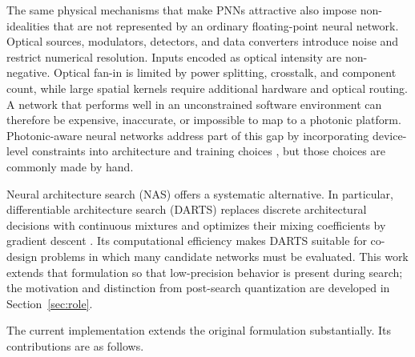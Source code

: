 \documentclass[lettersize,journal]{IEEEtran}
\begin{document}
The same physical mechanisms that make PNNs attractive also impose non-idealities that are not represented by an ordinary floating-point neural network. Optical sources, modulators, detectors, and data converters introduce noise and restrict numerical resolution. Inputs encoded as optical intensity are non-negative. Optical fan-in is limited by power splitting, crosstalk, and component count, while large spatial kernels require additional hardware and optical routing. A network that performs well in an unconstrained software environment can therefore be expensive, inaccurate, or impossible to map to a photonic platform. Photonic-aware neural networks address part of this gap by incorporating device-level constraints into architecture and training choices \cite{paolini2022photonic}, but those choices are commonly made by hand.

Neural architecture search (NAS) offers a systematic alternative. In particular, differentiable architecture search (DARTS) replaces discrete architectural decisions with continuous mixtures and optimizes their mixing coefficients by gradient descent \cite{liu2019darts}. Its computational efficiency makes DARTS suitable for co-design problems in which many candidate networks must be evaluated. This work extends that formulation so that low-precision behavior is present during search; the motivation and distinction from post-search quantization are developed in Section~\ref{sec:role}.

The current implementation extends the original formulation substantially. Its contributions are as follows.
\end{document}
